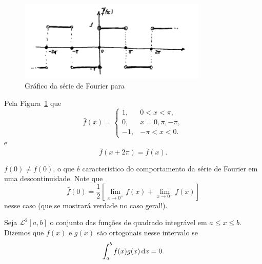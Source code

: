 \begin{figure}[!htb]
  \centering
  \includegraphics[width=0.8\textwidth]{figuras/01-1}
  \caption{Gráfico da série de Fourier para }
  \label{fig:serie_fourier_grafico02}
\end{figure}

Pela Figura~\ref{fig:serie_fourier_grafico02} que
\begin{dmath*}
  \bar{f}(x) = \begin{cases}
    1, & 0 < x < \pi, \\
    0, & x = 0, \pi, -\pi, \\
    -1, & -\pi < x < 0.
  \end{cases}
\end{dmath*}
e
\begin{dmath*}
  \bar{f}(x + 2 \pi) = \bar{f}(x).
\end{dmath*}

\begin{obs}
  $\bar{f}(0) \neq f(0)$, o que é característico do comportamento da série de
  Fourier em uma descontinuidade. Note que
  \begin{dmath*}
    \bar{f}(0) = \frac{1}{2} \left[ \lim_{x \to 0^+} f(x) + \lim_{x \to 0^-}
    f(x) \right]
  \end{dmath*}
  nesse caso (que se mostrará verdade no caso geral!).
\end{obs}

\begin{defi}
  Seja $\mathcal{L}^2[a, b]$ o conjunto das funções de quadrado integrável em $a
  \leq x \leq b$. Dizemos que $f(x)$ e $g(x)$ são ortogonais nesse intervalo se
  \begin{dmath*}
    \int_a^b f(x) g(x) \vi{x} = 0.
  \end{dmath*}
\end{defi}

